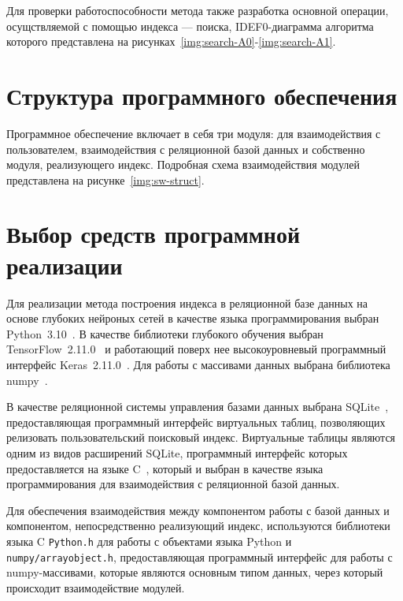 
Для проверки работоспособности метода также разработка основной операции,
осущствляемой с помощью индекса --- поиска, IDEF0-диаграмма алгоритма которого
представлена на рисунках~\ref{img:search-A0}-\ref{img:search-A1}.


\section{Структура программного обеспечения}

Программное обеспечение включает в себя три модуля: для взаимодействия с
пользователем, взаимодействия с реляционной базой данных и собственно модуля,
реализующего индекс. Подробная схема взаимодействия модулей представлена на
рисунке~\ref{img:sw-struct}.


\section{Выбор средств программной реализации}

Для реализации метода построения индекса в реляционной базе данных на основе
глубоких нейроных сетей в качестве языка программирования выбран
Python~3.10~\cite{python}.  В качестве библиотеки глубокого обучения выбран
TensorFlow~2.11.0~\cite{tf} и работающий поверх нее высокоуровневый программный
интерфейс Keras~2.11.0~\cite{keras}.  Для работы с массивами данных выбрана
библиотека numpy~\cite{numpy}.

В качестве реляционной системы управления базами данных выбрана
SQLite~\cite{sqlite}, предоставляющая программный интерфейс виртуальных таблиц,
позволяющих релизовать пользовательский поисковый индекс. Виртуальные таблицы
являются одним из видов расширений SQLite, программный интерфейс которых
предоставляется на языке C~\cite{c}, который и выбран в качестве языка
программирования для взаимодействия с реляционной базой данных.

Для обеспечения взаимодействия между компонентом работы с базой данных и
компонентом, непосредственно реализующий индекс, используются библиотеки языка C
\texttt{Python.h} для работы с объектами языка Python и
\texttt{numpy/arrayobject.h}, предоставляющая программный интерфейс для работы с
numpy-массивами, которые являются основным типом данных, через который
происходит взаимодействие модулей.

